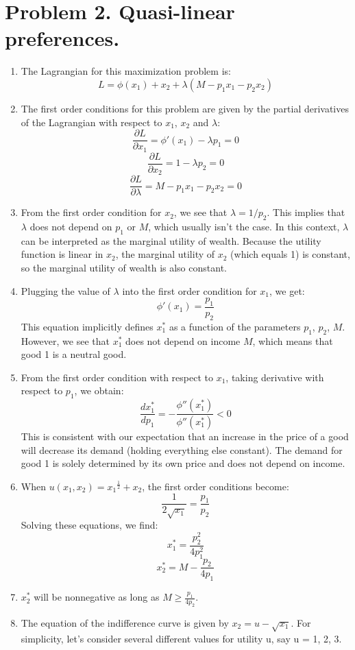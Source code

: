\documentclass[UTF8,titlepage]{article}
\numberwithin{figure}{section}
\begin{document}
\section{Problem 2. Quasi-linear preferences.}
\begin{enumerate}
  \item The Lagrangian for this maximization problem is:
  \[L = \phi(x_1) + x_2 + \lambda(M - p_1x_1 - p_2x_2)\]
  \item The first order conditions for this problem are given by the partial derivatives of the Lagrangian with respect to $x_1$, $x_2$ and $\lambda$:
  \[\frac{\partial L}{\partial x_1} = \phi'(x_1) - \lambda p_1 = 0\]
  \[\frac{\partial L}{\partial x_2} = 1 - \lambda p_2 = 0\]
  \[\frac{\partial L}{\partial \lambda} = M - p_1 x_1 - p_2 x_2 = 0\]
  \item From the first order condition for $x_2$, we see that $\lambda = 1/p_2$. This implies that $\lambda$ does not depend on $p_1$ or $M$, which usually isn't the case. In this context, $\lambda$ can be interpreted as the marginal utility of wealth. Because the utility function is linear in $x_2$, the marginal utility of $x_2$ (which equals 1) is constant, so the marginal utility of wealth is also constant.
  \item Plugging the value of $\lambda$ into the first order condition for $x_1$, we get:
  \[\phi'(x_1) = \frac{p_1}{p_2}\]
  This equation implicitly defines $x_1^*$ as a function of the parameters $p_1$, $p_2$, $M$. However, we see that $x_1^*$ does not depend on income $M$, which means that good 1 is a neutral good.
  \item From the first order condition with respect to $x_1$, taking derivative with respect to $p_1$, we obtain:
  \[\frac{d x_1^*}{dp_1} = -\frac{\phi''(x_1^*)}{\phi''(x_1^*)} < 0\]
  This is consistent with our expectation that an increase in the price of a good will decrease its demand (holding everything else constant). The demand for good 1 is solely determined by its own price and does not depend on income.
  \item When $u(x_1, x_2) = {x_1}^{\frac{1}{2}} + x_2$, the first order conditions become:
  \[\frac{1}{2\sqrt{x_1}} = \frac{p_1}{p_2}\]
  Solving these equations, we find:
  \[x_1^* = \frac{p_2^2}{4 p_1^2}\]
  \[x_2^* = M - \frac{p_2}{4 p_1}\]
  \item $x_2^*$ will be nonnegative as long as $M \geq \frac{p_1}{4 p_2}$.
  \item The equation of the indifference curve is given by $x_2 = u - \sqrt{x_1}$. For simplicity, let's consider several different values for utility u, say u = 1, 2, 3.
  

\end{enumerate}
\end{document}
